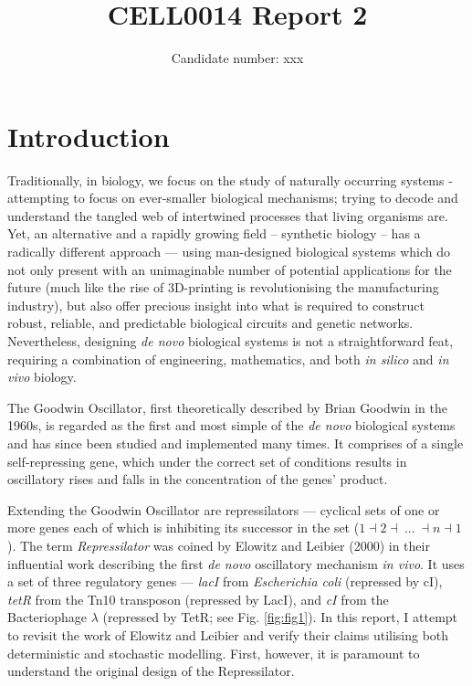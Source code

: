 \documentclass[runningheads,a4paper]{llncs}
\title{\textbf{CELL0014 Report 2}}
\author{\large{Candidate number: xxx}} %
\institute{\large{University College London}}
\begin{document}
%
\maketitle%

\bigskip
\bigskip
\onehalfspacing
%
\section*{Introduction}
Traditionally, in biology, we focus on the study of naturally occurring systems - attempting to focus on ever-smaller biological mechanisms; trying to decode and understand the tangled web of intertwined processes that living organisms are. Yet, an alternative and a rapidly growing field -- synthetic biology -- has a radically different approach --- using man-designed biological systems which do not only present with an unimaginable number of potential applications for the future (much like the rise of 3D-printing is revolutionising the manufacturing industry), but also offer precious insight into what is required to construct robust, reliable, and predictable biological circuits and genetic networks. Nevertheless, designing \textit{de novo} biological systems is not a straightforward feat, requiring a combination of engineering, mathematics, and both \textit{in silico} and \textit{in vivo} biology.

The Goodwin Oscillator, first theoretically described by Brian Goodwin in the 1960s, is regarded as the first and most simple of the \textit{de novo} biological systems and has since been studied and implemented many times\cite{Gonze2013a, Purcell2010a}. It comprises of a single self-repressing gene, which under the correct set of conditions results in oscillatory rises and falls in the concentration of the genes' product. 

Extending the Goodwin Oscillator are repressilators --- cyclical sets of one or more genes each of which is inhibiting its successor in the set ($1 \dashv 2 \dashv\ ...\ \dashv n \dashv 1$)\cite{Muller2006, Purcell2010a}. The term \textit{Repressilator} was coined by Elowitz and Leibier (2000)\cite{Elowitz2000d} in their influential work describing the first \textit{de novo} oscillatory mechanism \textit{in vivo}. It uses a set of three regulatory genes --- \textit{lacI} from \textit{Escherichia coli} (repressed by cI), \textit{tetR} from the Tn10 transposon (repressed by LacI), and \textit{cI} from the Bacteriophage $\lambda$ (repressed by TetR; see Fig. \ref{fig:fig1})\cite{Elowitz2000d}. In this report, I attempt to revisit the work of Elowitz and Leibier and verify their claims utilising both deterministic and stochastic modelling. First, however, it is paramount to understand the original design of the Repressilator.
\end{document}
